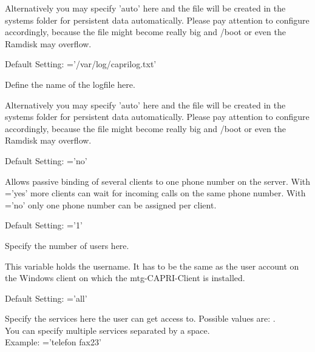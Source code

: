 \begin{description}
        Alternatively you may specify 'auto' here and the file will be created
        in the systems folder for persistent data automatically.
        Please pay attention to configure  accordingly,
        because the file might become really big and /boot or even the Ramdisk
        may overflow.


        Default Setting: ='/var/log/caprilog.txt'

        Define the name of the logfile here.

        Alternatively you may specify 'auto' here and the file will be created
        in the systems folder for persistent data automatically.
        Please pay attention to configure  accordingly,
        because the file might become really big and /boot or even the Ramdisk
        may overflow.


        Default Setting: ='no'

        Allows passive binding of several clients to one phone number on the
        server. With ='yes' more clients can wait for incoming
        calls on the same phone number. With ='no'
        only one phone number can be assigned per client.


        Default Setting: ='1'

        Specify the number of users here.


        This variable holds the username. It has to be the same as the user
        account on the Windows client on which the mtg-CAPRI-Client
        is installed.


        Default Setting: ='all'

        Specify the services here the user can get access to.
        Possible values are: . \\
        You can specify multiple services separated by a space. \\
        Example: ='telefon fax23'


\end{description}
